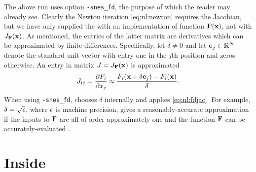 The above run uses option \texttt{-snes\_fd}, the purpose of which the reader may already see.  Clearly the Newton iteration \eqref{eq:nl:newton} requires the Jacobian, but we have only supplied the \pSNES with an implementation of function $\mathbf{F}(\mathbf{x})$, not with $J_{\mathbf{F}}(\mathbf{x})$.  As mentioned, the entries of the latter matrix are derivatives which can be approximated by finite differences.  Specifically, let $\delta\ne 0$ and let $\mathbf{e}_j\in \mathbb{R}^N$ denote the standard unit vector with entry one in the $j$th position and zeros otherwise.  An entry in matrix $J=J_{\mathbf{F}}(\mathbf{x})$ is approximated
\begin{equation}
J_{ij} = \frac{\partial F_i}{\partial x_j} \approx \frac{F_i(\mathbf{x}+\delta \mathbf{e}_j) - F_i(\mathbf{x})}{\delta}.  \label{eq:nl:fdjac}
\end{equation}
When using \texttt{-snes\_fd}, \PETSc chooses $\delta$ internally and applies \eqref{eq:nl:fdjac}.  For example, $\delta = \sqrt{\epsilon}$, where $\epsilon$ is machine precision, gives a reasonably-accurate approximation if the inputs to $\mathbf{F}$ are all of order approximately one and the function $\mathbf{F}$ can be accurately-evaluated \citep{Kelley2003}.


\section{Inside \pSNES} \label{sec:insidesnes}

